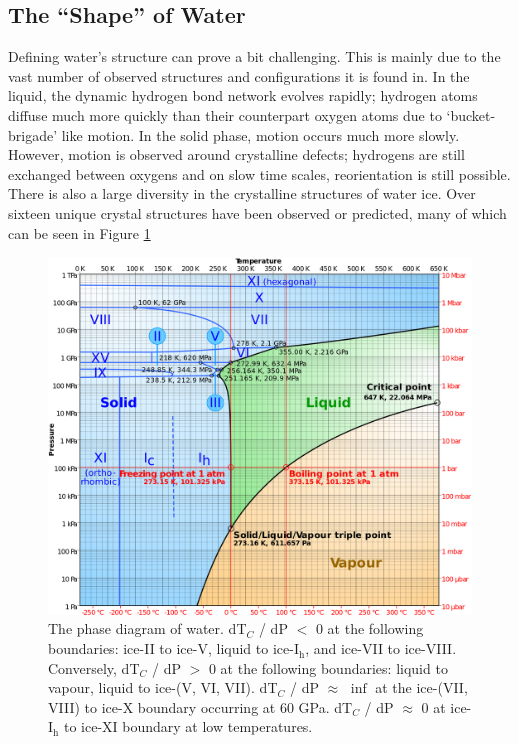 \subsection{The ``Shape'' of Water}
%
%
Defining water's structure can prove a bit challenging. This is mainly
due to the vast number of observed structures and configurations it is
found in. In the liquid, the dynamic hydrogen bond network evolves
rapidly; hydrogen atoms diffuse much more quickly than their
counterpart oxygen atoms due to `bucket-brigade' like motion. In the
solid phase, motion occurs much more slowly. However, motion is
observed around crystalline defects; hydrogens are still exchanged
between oxygens and on slow time scales, reorientation is still
possible. There is also a large diversity in the crystalline
structures of water ice. Over sixteen unique crystal structures
have been observed or predicted\cite{Chaplin2018}, many of which can
be seen in Figure \ref{fig:phaseDiagram}

\begin{figure}
\includegraphics[width=\linewidth]{Figures/PhaseDiagram}
\caption{\label{fig:phaseDiagram} The phase diagram of
  water.\cite{Zhang2015} dT$_{C}$ / dP $<$ 0 at the following boundaries:
  ice-II to ice-V, liquid to ice-I$_\mathrm{h}$, and ice-VII to
  ice-VIII. Conversely, dT$_{C}$ / dP $>$ 0 at the following boundaries:
  liquid to vapour, liquid to ice-(V, VI, VII). dT$_{C}$ / dP $\approx$
  $\inf$ at the ice-(VII, VIII) to ice-X boundary occurring at 60 GPa.
  dT$_{C}$ / dP $\approx$ 0 at ice-I$_\mathrm{h}$ to ice-XI boundary at
  low temperatures. }
\end{figure}


